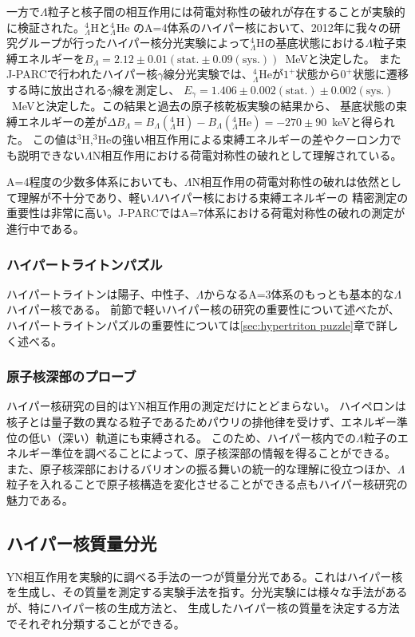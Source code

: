 \documentclass[a4paper,11pt,uplatex]{jsbook}
\begin{document}
一方で$\Lambda$粒子と核子間の相互作用には荷電対称性の破れが存在することが実験的に検証された。$^4_\Lambda \text{H}$と$^4_\Lambda \text{He}$
のA=4体系のハイパー核において、2012年に我々の研究グループが行ったハイパー核分光実験によって$^4_\Lambda \text{H}$の基底状態における$\Lambda$粒子束縛エネルギーを$B_\Lambda = 2.12 \pm 0.01 (\text{stat.} \pm 0.09 (\text{sys.}))$~MeVと決定した\cite{esserObservation4Hyperhydrogen2015,NagaoD}。
またJ-PARCで行われたハイパー核$\gamma$線分光実験では、$^4_\Lambda \text{He}$が$1^+$状態から$0^+$状態に遷移する時に放出される$\gamma$線を測定し、
$E_\gamma = 1.406 \pm 0.002(\text{stat.}) \pm 0.002 (\text{sys.})$~MeVと決定した\cite{yamamoto2015}。この結果と過去の原子核乾板実験の結果から、
基底状態の束縛エネルギーの差が$\Delta B_\Lambda = B_\Lambda(^4_\Lambda\text{H}) - B_\Lambda(^4_\Lambda\text{He}) = -270 \pm 90$~keVと得られた。
この値は$^3\text{H}$,$^3\text{He}$の強い相互作用による束縛エネルギーの差やクーロン力でも説明できない$\Lambda$N相互作用における荷電対称性の破れとして理解されている。

A=4程度の少数多体系においても、$\Lambda$N相互作用の荷電対称性の破れは依然として理解が不十分であり、軽い$\Lambda$ハイパー核における束縛エネルギーの
精密測定の重要性は非常に高い。J-PARCではA=7体系における荷電対称性の破れの測定が進行中である。
\subsubsection{ハイパートライトンパズル}
ハイパートライトンは陽子、中性子、$\Lambda$からなるA=3体系のもっとも基本的な$\Lambda$ハイパー核である。
前節で軽いハイパー核の研究の重要性について述べたが、ハイパートライトンパズルの重要性については\ref{sec:hypertriton puzzle}章で詳しく述べる。
\subsubsection{原子核深部のプローブ}
ハイパー核研究の目的はYN相互作用の測定だけにとどまらない。
ハイペロンは核子とは量子数の異なる粒子であるためパウリの排他律を受けず、エネルギー準位の低い（深い）軌道にも束縛される。
このため、ハイパー核内での$\Lambda$粒子のエネルギー準位を調べることによって、原子核深部の情報を得ることができる。
また、原子核深部におけるバリオンの振る舞いの統一的な理解に役立つほか、$\Lambda$粒子を入れることで原子核構造を変化させることができる点もハイパー核研究の魅力である。

\subsection{ハイパー核質量分光}
YN相互作用を実験的に調べる手法の一つが質量分光である。これはハイパー核を生成し、その質量を測定する実験手法を指す。分光実験には様々な手法があるが、特にハイパー核の生成方法と、
生成したハイパー核の質量を決定する方法でそれぞれ分類することができる。
\end{document}
